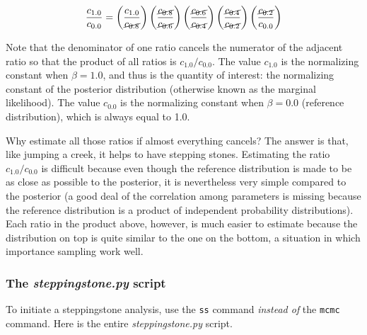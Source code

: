 \documentclass[10pt]{article}
\newcommand{\pathname}[1]{{\em #1}}				%
\newcommand{\cmd}[1]{{\tt \small #1}\index{#1}}	%
\begin{document}
\[\frac{c_{1.0}}{c_{0.0}} = \left(\frac{c_{1.0}}{\cancel{c_{0.8}}}\right) \left(\frac{\cancel{c_{0.8}}}{\cancel{c_{0.6}}}\right) \left(\frac{\cancel{c_{0.6}}}{\cancel{c_{0.4}}}\right) \left(\frac{\cancel{c_{0.4}}}{\cancel{c_{0.2}}}\right) \left(\frac{\cancel{c_{0.2}}}{c_{0.0}}\right)\]

Note that the denominator of one ratio cancels the numerator of the adjacent ratio so that the product of all ratios is $c_{1.0}/c_{0.0}$. The value $c_{1.0}$ is the normalizing constant when $\beta = 1.0$, and thus is the quantity of interest: the normalizing constant of the posterior distribution (otherwise known as the marginal likelihood). The value $c_{0.0}$ is the normalizing constant when $\beta = 0.0$ (reference distribution), which is always equal to 1.0.

Why estimate all those ratios if almost everything cancels? The answer is that, like jumping a creek, it helps to have stepping stones. Estimating the ratio $c_{1.0}/c_{0.0}$ is difficult because even though the reference distribution is made to be as close as possible to the posterior, it is nevertheless very simple compared to the posterior (a good deal of the correlation among parameters is missing because the reference distribution is a product of independent probability distributions). Each ratio in the product above, however, is much easier to estimate because the distribution on top is quite similar to the one on the bottom, a situation in which importance sampling work well.

\subsubsection{The \pathname{steppingstone.py} script}
To initiate a steppingstone analysis, use the \cmd{ss} command {\em instead of} the \cmd{mcmc} command. Here is the entire \pathname{steppingstone.py} script. 
\end{document}
